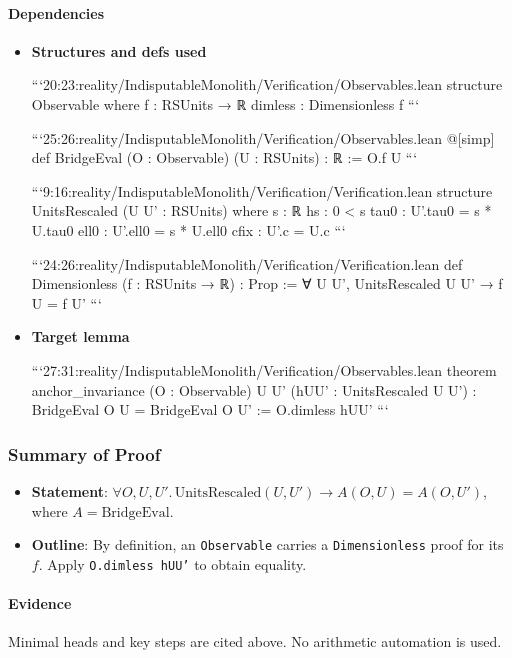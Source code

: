 \documentclass{article}
\begin{document}
\paragraph{Dependencies}
\begin{itemize}[leftmargin=*]
  \item \textbf{Structures and defs used}

```20:23:reality/IndisputableMonolith/Verification/Observables.lean
structure Observable where
  f       : RSUnits → ℝ
  dimless : Dimensionless f
```

```25:26:reality/IndisputableMonolith/Verification/Observables.lean
@[simp] def BridgeEval (O : Observable) (U : RSUnits) : ℝ := O.f U
```

```9:16:reality/IndisputableMonolith/Verification/Verification.lean
structure UnitsRescaled (U U' : RSUnits) where
  s    : ℝ
  hs   : 0 < s
  tau0 : U'.tau0 = s * U.tau0
  ell0 : U'.ell0 = s * U.ell0
  cfix : U'.c = U.c
```

```24:26:reality/IndisputableMonolith/Verification/Verification.lean
def Dimensionless (f : RSUnits → ℝ) : Prop := ∀ {U U'}, UnitsRescaled U U' → f U = f U'
```

  \item \textbf{Target lemma}

```27:31:reality/IndisputableMonolith/Verification/Observables.lean
theorem anchor_invariance (O : Observable) {U U'}
  (hUU' : UnitsRescaled U U') : BridgeEval O U = BridgeEval O U' :=
  O.dimless hUU'
```
\end{itemize}

\subsubsection{Summary of Proof}
\begin{itemize}[leftmargin=*]
  \item \textbf{Statement}: \(\forall O,U,U'.\,\mathrm{UnitsRescaled}(U,U') \to A(O,U)=A(O,U')\), where \(A=\mathrm{BridgeEval}\).
  \item \textbf{Outline}: By definition, an \texttt{Observable} carries a \texttt{Dimensionless} proof for its \(f\). Apply \texttt{O.dimless hUU'} to obtain equality.
\end{itemize}

\paragraph{Evidence}
Minimal heads and key steps are cited above. No arithmetic automation is used.
\end{document}
